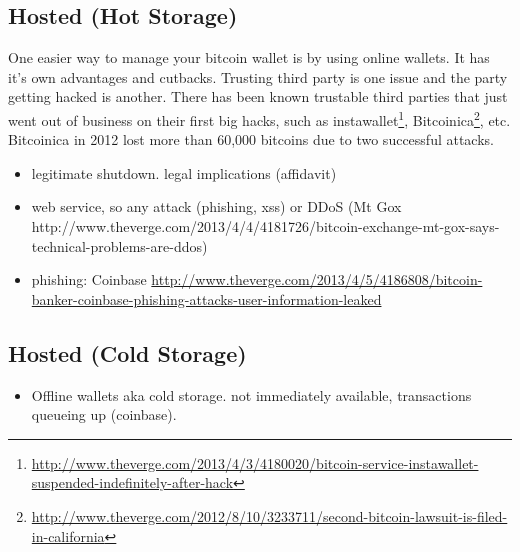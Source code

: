 \subsection{Hosted (Hot Storage)} 
One easier way to manage your bitcoin wallet is by using online wallets. It has it's own advantages and cutbacks. Trusting third party is one issue and the party getting hacked is another. There has been known trustable third parties that just went out of business on their first big hacks, such as instawallet\footnote{\url{http://www.theverge.com/2013/4/3/4180020/bitcoin-service-instawallet-suspended-indefinitely-after-hack}}, Bitcoinica\footnote{\url{http://www.theverge.com/2012/8/10/3233711/second-bitcoin-lawsuit-is-filed-in-california}}, etc. Bitcoinica in 2012 lost more than 60,000 bitcoins due to two successful attacks.
\begin{itemize}
  \item legitimate shutdown. legal implications (affidavit)
  \item web service, so any attack (phishing, xss) or DDoS (Mt Gox http://www.theverge.com/2013/4/4/4181726/bitcoin-exchange-mt-gox-says-technical-problems-are-ddos)
  \item phishing: Coinbase \url{http://www.theverge.com/2013/4/5/4186808/bitcoin-banker-coinbase-phishing-attacks-user-information-leaked}
\end{itemize}


\subsection{Hosted (Cold Storage)} 

\begin{itemize}
  \item Offline wallets aka cold storage. not immediately available, transactions queueing up (coinbase). 
\end{itemize}

